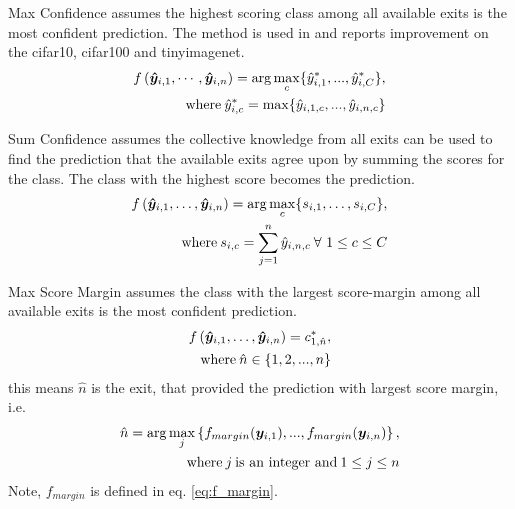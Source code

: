 \begin{enumdescript}
\begin{enumdescript}
		\item[Max Confidence] assumes the highest scoring class among all available exits is the most confident prediction. The method is used in \cite{kaya_shallow-deep_nodate} and reports improvement on the \gls{cifar10}, \gls{cifar100} and \gls{tinyimagenet}. 
		\begin{align}
		\begin{split}
		f\left(\bm{\hat{y}}_{i,1}, \cdots, \bm{\hat{y}}_{i,n} \right) =  \arg \underset{c}{\max} \{\hat{y}^*_{i,1}, ..., \hat{y}^*_{i,C} \},
		\\ \text{where\:} \hat{y}^*_{i,c} = \max \{\hat{y}_{i,1,c}, ..., \hat{y}_{i,n,c}\}
		\end{split}	
		\end{align}
		\item[Sum Confidence] assumes the collective knowledge from all exits can be used to find the prediction that the available exits agree upon by summing the scores for the class. The class with the highest score becomes the prediction.
		\begin{align}
		\begin{split}
		f\left(\bm{\hat{y}}_{i,1}, \dots, \bm{\hat{y}}_{i,n} \right) = \arg \underset{c}{\max} \{s_{i,1}, \dots, s_{i,C}\}, \\ \text{where\:} s_{i,c} = \sum_{j=1}^{n}\hat{y}_{i,n,c}\: \forall \ 1\le c \le C
		\end{split}
		\end{align}			
		\item[Max Score Margin] assumes the class with the largest score-margin among all available exits is the most confident prediction. 			\begin{align}
		\begin{split}
		f\left(\bm{\hat{y}}_{i,1}, \dots, \bm{\hat{y}}_{i,n} \right) =c^*_{1,\hat{n}},\\
		\text{where\:} \hat{n} \in \{1, 2, ..., n\}
		\end{split}	
		\end{align}
		this means $ \hat{n} $ is the exit, that provided the prediction with largest score margin, i.e.
		\begin{align*}
		\begin{split}
		\hat{n} = \arg \underset{j}{\max} \left\{f_{margin}(\bm{y}_{i,1}), ..., f_{margin}(\bm{y}_{i,n})\right\} ,\\
		\text{where\:} j \text{\:is an integer and\:} 1 \le j \le n
		\end{split}
		\end{align*}
		Note, $ f_{margin} $ is defined in eq. \ref{eq:f_margin}.
	\end{enumdescript}
	

\end{enumdescript}
